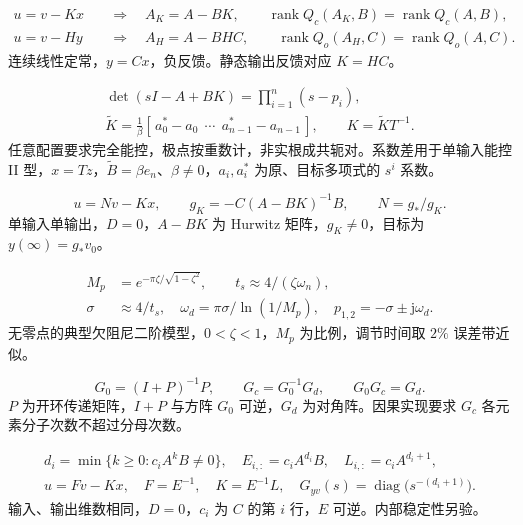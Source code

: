 
{\[
\begin{aligned}
    u=v-Kx \quad&\Longrightarrow\quad A_K=A-BK,\qquad
       \operatorname{rank}Q_c(A_K,B)=\operatorname{rank}Q_c(A,B),\\
    u=v-Hy \quad&\Longrightarrow\quad A_H=A-BHC,\qquad
       \operatorname{rank}Q_o(A_H,C)=\operatorname{rank}Q_o(A,C).
\end{aligned}
\]}
{连续线性定常，$y=Cx$，负反馈。静态输出反馈对应 $K=HC$。}

{\[
\begin{gathered}
    \det(sI-A+BK)=\prod\nolimits_{i=1}^{n}(s-p_i),\\
    \widetilde K=\frac{1}{\beta}
       [\,a_0^\ast-a_0\ \ \cdots\ \ a_{n-1}^\ast-a_{n-1}\,],
       \qquad K=\widetilde K T^{-1}.
\end{gathered}
\]}
{任意配置要求完全能控，极点按重数计，非实根成共轭对。系数差用于单输入能控 II 型，$x=Tz$，$\widetilde B=\beta e_n$、$\beta\ne0$，$a_i,a_i^\ast$ 为原、目标多项式的 $s^i$ 系数。}

{\[
    u=Nv-Kx,\qquad
    g_K=-C(A-BK)^{-1}B,\qquad N=g_\ast/g_K .
\]}
{单输入单输出，$D=0$，$A-BK$ 为 Hurwitz 矩阵，$g_K\ne0$，目标为 $y(\infty)=g_\ast v_0$。}

{\[
\begin{aligned}
    M_p&=e^{-\pi\zeta/\sqrt{1-\zeta^2}},\qquad t_s\approx4/(\zeta\omega_n),\\
    \sigma&\approx4/t_s,\quad
    \omega_d=\pi\sigma/\ln(1/M_p),\quad
    p_{1,2}=-\sigma\pm\mathrm j\omega_d .
\end{aligned}
\]}
{无零点的典型欠阻尼二阶模型，$0<\zeta<1$，$M_p$ 为比例，调节时间取 $2\%$ 误差带近似。}

{\[
    G_0=(I+P)^{-1}P,\qquad
    G_c=G_0^{-1}G_d,\qquad G_0G_c=G_d .
\]}
{$P$ 为开环传递矩阵，$I+P$ 与方阵 $G_0$ 可逆，$G_d$ 为对角阵。因果实现要求 $G_c$ 各元素分子次数不超过分母次数。}

{\[
\begin{gathered}
    d_i=\min\{k\ge0:c_iA^kB\ne0\},\quad
    E_{i,:}=c_iA^{d_i}B,\quad L_{i,:}=c_iA^{d_i+1},\\
    u=Fv-Kx,\quad F=E^{-1},\quad K=E^{-1}L,\quad
    G_{yv}(s)=\operatorname{diag}\bigl(s^{-(d_i+1)}\bigr).
\end{gathered}
\]}
{输入、输出维数相同，$D=0$，$c_i$ 为 $C$ 的第 $i$ 行，$E$ 可逆。内部稳定性另验。}

